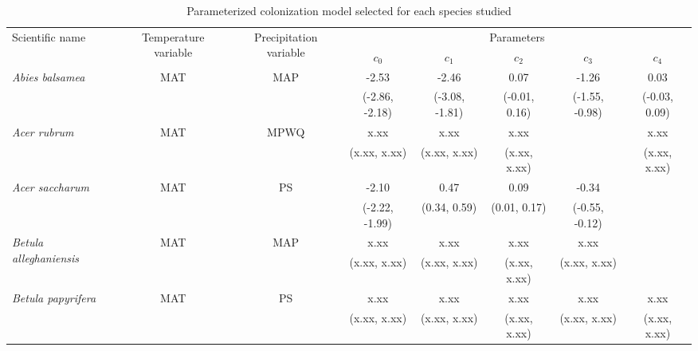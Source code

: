 \documentclass[11pt]{article}
\begin{document}

\newcommand{\ts}{\scriptsize}
\begin{table}[tb]
\small
\begin{threeparttable}
\label{tab:model_selection}
\caption{Parameterized colonization model selected for each species studied}
\begin{tabular}{lccccccc}
\toprule
\multirow{2}{*}{Scientific name} & \multirow{2}{2cm}{\centering Temperature variable\tnote{*}} & 
\multirow{2}{2cm}{\centering Precipitation variable\tnote{\textdagger}} & \multicolumn{5}{c}{Parameters\tnote{\textdaggerdbl}} \\
& & & $c_0$ & $c_1$ & $c_2$ & $c_3$ & $c_4$ \\ 
\midrule

\multirow{2}{*}{\it Abies balsamea} & \multirow{2}{*}{MAT} & \multirow{2}{*}{MAP} & -2.53\tnote{\textsection} & -2.46 & 0.07 & -1.26 & 0.03 \\
 &  &  & {\ts (-2.86, -2.18)} & {\ts (-3.08, -1.81)} & {\ts (-0.01, 0.16)} & {\ts (-1.55, -0.98)} & {\ts (-0.03, 0.09)} \\

\multirow{2}{*}{\it Acer rubrum} & \multirow{2}{*}{MAT} & \multirow{2}{*}{MPWQ} & x.xx & x.xx & x.xx &  & x.xx \\
 &  &  & {\ts (x.xx, x.xx)} & {\ts (x.xx, x.xx)} & {\ts (x.xx, x.xx)} &  & {\ts (x.xx, x.xx)} \\

\multirow{2}{*}{\it Acer saccharum} & \multirow{2}{*}{MAT} & \multirow{2}{*}{PS} & -2.10 & 0.47 & 0.09 & -0.34 &  \\
 &  &  & {\ts (-2.22, -1.99)} & {\ts (0.34, 0.59)} & {\ts (0.01, 0.17)} & {\ts (-0.55, -0.12)} &  \\

\multirow{2}{*}{\it Betula alleghaniensis} & \multirow{2}{*}{MAT} & \multirow{2}{*}{MAP} & x.xx & x.xx & x.xx & x.xx & \\
 &  &  & {\ts (x.xx, x.xx)} & {\ts (x.xx, x.xx)} & {\ts (x.xx, x.xx)} & {\ts (x.xx, x.xx)} & \\

\multirow{2}{*}{\it Betula papyrifera} & \multirow{2}{*}{MAT} & \multirow{2}{*}{PS} & x.xx & x.xx & x.xx & x.xx & x.xx \\
 &  &  & {\ts (x.xx, x.xx)} & {\ts (x.xx, x.xx)} & {\ts (x.xx, x.xx)} & {\ts (x.xx, x.xx)} & {\ts (x.xx, x.xx)} \\


\end{tabular}
\end{threeparttable}
\end{table}
\end{document}
